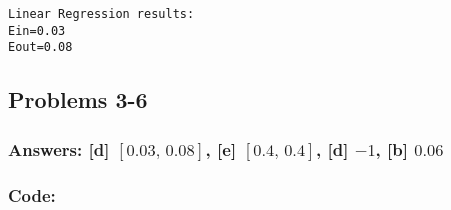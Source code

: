 \documentclass[11pt]{article}
\begin{document}
    \begin{Verbatim}[commandchars=\\\{\}]
Linear Regression results:
Ein=0.03
Eout=0.08
    \end{Verbatim}

    \hypertarget{problems-3-6}{%
\subsection{Problems 3-6}\label{problems-3-6}}

\hypertarget{answers-d-0.030.08-e-0.40.4-d--1-b-0.06}{%
\subsubsection{\texorpdfstring{Answers: {[}d{]} \([0.03,\,0.08]\),
{[}e{]} \([0.4,\,0.4]\), {[}d{]} \(-1\), {[}b{]}
\(0.06\)}{Answers: {[}d{]} {[}0.03,\textbackslash{},0.08{]}, {[}e{]} {[}0.4,\textbackslash{},0.4{]}, {[}d{]} -1, {[}b{]} 0.06}}\label{answers-d-0.030.08-e-0.40.4-d--1-b-0.06}}

\hypertarget{code}{%
\subsubsection{Code:}\label{code}}
\end{document}
